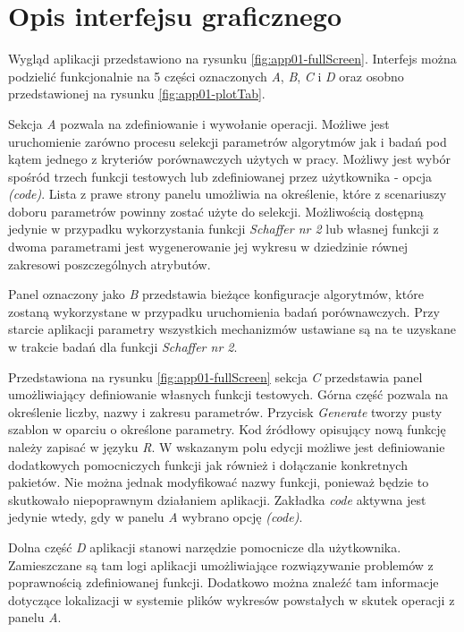 \section{Opis interfejsu graficznego}

\par
Wygląd aplikacji przedstawiono na rysunku \ref{fig:app01-fullScreen}. Interfejs można podzielić funkcjonalnie na 5 części oznaczonych \emph{A}, \emph{B}, \emph{C} i \emph{D} oraz osobno przedstawionej na rysunku \ref{fig:app01-plotTab}. 

\par
Sekcja \emph{A} pozwala na zdefiniowanie i wywołanie operacji. Możliwe jest uruchomienie zarówno procesu selekcji parametrów algorytmów jak i badań pod kątem jednego z kryteriów porównawczych użytych w pracy. Możliwy jest wybór spośród trzech funkcji testowych lub zdefiniowanej przez użytkownika - opcja \emph{(code)}. Lista z prawe strony panelu umożliwia na określenie, które z scenariuszy doboru parametrów powinny zostać użyte do selekcji. Możliwością dostępną jedynie w przypadku wykorzystania funkcji \emph{Schaffer nr 2} lub własnej funkcji z dwoma parametrami jest wygenerowanie jej wykresu w dziedzinie równej zakresowi poszczególnych atrybutów. 

\par
Panel oznaczony jako \emph{B} przedstawia bieżące konfiguracje algorytmów, które zostaną wykorzystane w przypadku uruchomienia badań porównawczych. Przy starcie aplikacji parametry wszystkich mechanizmów ustawiane są na te uzyskane w trakcie badań dla funkcji \emph{Schaffer nr 2}.

\par
Przedstawiona na rysunku \ref{fig:app01-fullScreen} sekcja \emph{C} przedstawia panel umożliwiający definiowanie własnych funkcji testowych. Górna część pozwala na określenie liczby, nazwy i zakresu parametrów. Przycisk \emph{Generate} tworzy pusty szablon w oparciu o określone parametry. Kod źródłowy opisujący nową funkcję należy zapisać w języku \emph{R}. W wskazanym polu edycji możliwe jest definiowanie dodatkowych pomocniczych funkcji jak również i dołączanie konkretnych pakietów. Nie można jednak modyfikować nazwy funkcji, ponieważ będzie to skutkowało niepoprawnym działaniem aplikacji. Zakładka \emph{code} aktywna jest jedynie wtedy, gdy w panelu \emph{A} wybrano opcję \emph{(code)}.

\par
Dolna część \emph{D} aplikacji stanowi narzędzie pomocnicze dla użytkownika. Zamieszczane są tam logi aplikacji umożliwiające rozwiązywanie problemów z poprawnością zdefiniowanej funkcji. Dodatkowo można znaleźć tam informacje dotyczące lokalizacji w systemie plików wykresów powstałych w skutek operacji z panelu \emph{A}. 


